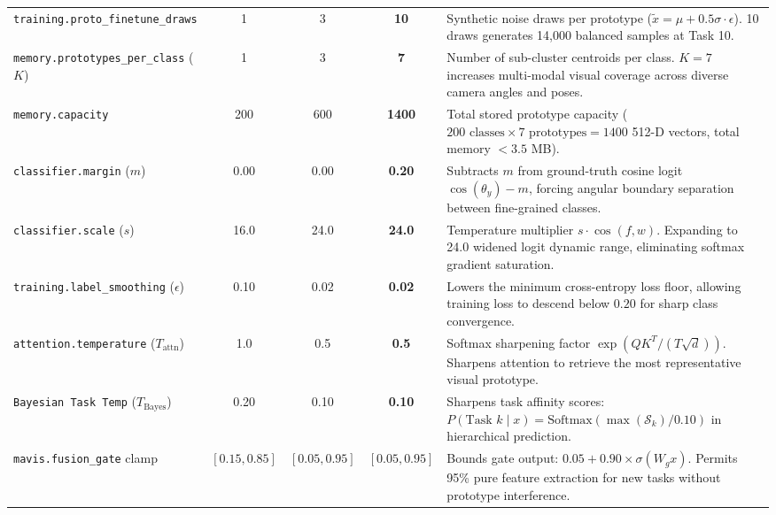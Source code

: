 \documentclass[11pt,a4paper]{article}
\begin{document}
\begin{table}[h!]
\begin{tabularx}{\textwidth}{p{3.2cm} c c c p{6.8cm}}
    \texttt{training.proto\_finetune\_draws} & 1 & 3 & \textbf{10} & Synthetic noise draws per prototype ($\tilde{x} = \mu + 0.5\sigma \cdot \epsilon$). 10 draws generates 14,000 balanced samples at Task 10. \\
    \texttt{memory.prototypes\_per\_class} ($K$) & 1 & 3 & \textbf{7} & Number of sub-cluster centroids per class. $K=7$ increases multi-modal visual coverage across diverse camera angles and poses. \\
    \texttt{memory.capacity} & 200 & 600 & \textbf{1400} & Total stored prototype capacity ($200 \text{ classes} \times 7 \text{ prototypes} = 1400$ 512-D vectors, total memory $<3.5$ MB). \\
    \texttt{classifier.margin} ($m$) & 0.00 & 0.00 & \textbf{0.20} & Subtracts $m$ from ground-truth cosine logit $\cos(\theta_y) - m$, forcing angular boundary separation between fine-grained classes. \\
    \texttt{classifier.scale} ($s$) & 16.0 & 24.0 & \textbf{24.0} & Temperature multiplier $s \cdot \cos(f, w)$. Expanding to 24.0 widened logit dynamic range, eliminating softmax gradient saturation. \\
    \texttt{training.label\_smoothing} ($\epsilon$) & 0.10 & 0.02 & \textbf{0.02} & Lowers the minimum cross-entropy loss floor, allowing training loss to descend below $0.20$ for sharp class convergence. \\
    \texttt{attention.temperature} ($T_{\text{attn}}$) & 1.0 & 0.5 & \textbf{0.5} & Softmax sharpening factor $\exp(QK^T / (T \sqrt{d}))$. Sharpens attention to retrieve the most representative visual prototype. \\
    \texttt{Bayesian Task Temp} ($T_{\text{Bayes}}$) & 0.20 & 0.10 & \textbf{0.10} & Sharpens task affinity scores: $P(\text{Task } k \mid x) = \text{Softmax}(\max(\mathcal{S}_k) / 0.10)$ in hierarchical prediction. \\
    \texttt{mavis.fusion\_gate} clamp & $[0.15, 0.85]$ & $[0.05, 0.95]$ & \textbf{$[0.05, 0.95]$} & Bounds gate output: $0.05 + 0.90 \times \sigma(W_g x)$. Permits 95\% pure feature extraction for new tasks without prototype interference. \\
    \bottomrule
    \end{tabularx}
    \end{table}

    \newpage

\end{document}
